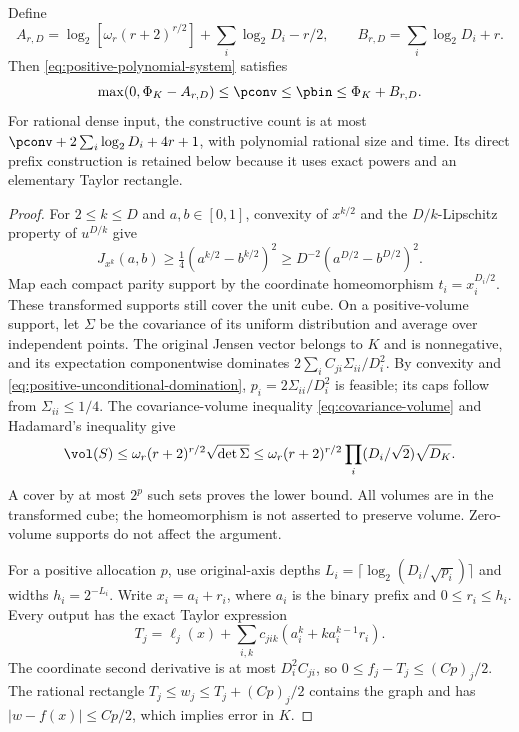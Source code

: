 \begin{proposition}\label{prop:positive-baseline}
Define
\[
 A_{r,D}=\log_2[\omega_r(r+2)^{r/2}]+\sum_i\log_2D_i-r/2,
 \qquad B_{r,D}=\sum_i\log_2D_i+r.
\]
Then \eqref{eq:positive-polynomial-system} satisfies
\begin{equation}\label{eq:positive-baseline-law}
 \max(0,\Phi_K-A_{r,D})\le\pconv\le\pbin
 \le\Phi_K+B_{r,D}.
\end{equation}
For rational dense input, the constructive count is at most
$\pconv+2\sum_i\log_2D_i+4r+1$, with polynomial rational size and
time. Its direct prefix construction is retained below because it
uses exact powers and an elementary Taylor rectangle.
\end{proposition}
\begin{proof}
For $2\le k\le D$ and $a,b\in[0,1]$, convexity of $x^{k/2}$ and
the $D/k$-Lipschitz property of $u^{D/k}$ give
\[
 J_{x^k}(a,b)\ge\tfrac14(a^{k/2}-b^{k/2})^2
 \ge D^{-2}(a^{D/2}-b^{D/2})^2.
\]
Map each compact parity support by the coordinate homeomorphism
$t_i=x_i^{D_i/2}$. These transformed supports still cover the unit
cube. On a positive-volume support, let $\Sigma$ be the covariance
of its uniform distribution and average over independent points.
The original Jensen vector belongs to $K$ and is nonnegative, and
its expectation componentwise dominates
$2\sum_iC_{ji}\Sigma_{ii}/D_i^2$. By convexity and
\eqref{eq:positive-unconditional-domination}, $p_i=2\Sigma_{ii}/D_i^2$ is
feasible; its caps follow from $\Sigma_{ii}\le1/4$.
The covariance-volume inequality \eqref{eq:covariance-volume} and
Hadamard's inequality give
\[
 \vol(S)\le\omega_r(r+2)^{r/2}\sqrt{\det\Sigma}
 \le\omega_r(r+2)^{r/2}\prod_i(D_i/\sqrt2)\sqrt{D_K}.
\]
A cover by at most $2^p$ such sets proves the lower bound. All volumes
are in the transformed cube; the homeomorphism is not asserted to
preserve volume. Zero-volume supports do not affect the argument.

For a positive allocation $p$, use original-axis depths
$L_i=\lceil\log_2(D_i/\sqrt{p_i})\rceil$ and widths
$h_i=2^{-L_i}$. Write $x_i=a_i+r_i$, where $a_i$ is the binary
prefix and $0\le r_i\le h_i$. Every output has the exact Taylor
expression
\[
 T_j=\ell_j(x)+\sum_{i,k}c_{jik}
                 (a_i^k+k a_i^{k-1}r_i).
\]
The coordinate second derivative is at most $D_i^2C_{ji}$, so
$0\le f_j-T_j\le(Cp)_j/2$. The rational rectangle
$T_j\le w_j\le T_j+(Cp)_j/2$ contains the graph and has
$|w-f(x)|\le Cp/2$, which implies error in $K$.


\end{proof}

